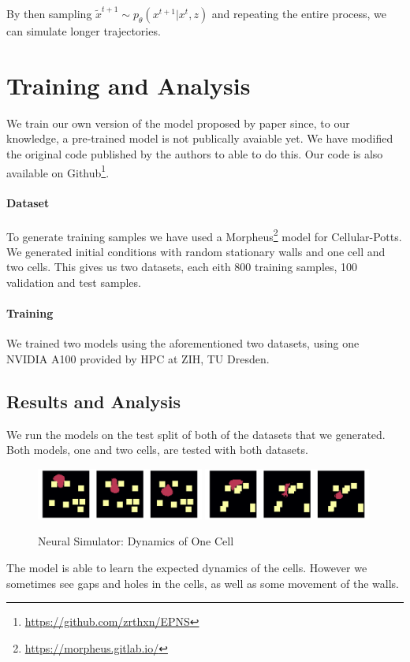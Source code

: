 \documentclass[a4paper,10pt,twocolumn]{article}
\begin{document}
            By then sampling $\tilde{x}^{t+1} \sim p_\theta(x^{t+1}|x^t, z)$ and
            repeating the entire process, we can simulate longer trajectories.


    \section{Training and Analysis}
        We train our own version of the model proposed by paper since, to our knowledge, 
        a pre-trained model is not publically avaiable yet. We have modified the original
        code published by the authors to able to do this. 
        Our code is also available on Github\footnote{\url{https://github.com/zrthxn/EPNS}}.

        \paragraph{Dataset}
        To generate training samples we have used a Morpheus\footnote{\url{https://morpheus.gitlab.io/}}\cite{morpheus} 
        model for Cellular-Potts.
        We generated initial conditions with random stationary walls and one cell and two cells. 
        This gives us two datasets, each eith 800 training samples, 100 validation and test samples.
        
        \paragraph{Training}
        We trained two models using the aforementioned two datasets, using one NVIDIA A100 
        provided by HPC at ZIH, TU Dresden.

        \subsection{Results and Analysis}
            We run the models on the test split of both of the datasets that we generated.
            Both models, one and two cells, are tested with both datasets.

            \begin{figure}[H]\centering
                \includegraphics[width=0.49\textwidth]{../images/run_40.png}
                \includegraphics[width=0.49\textwidth]{../images/run_32.png}
                \caption{Neural Simulator: Dynamics of One Cell}
            \end{figure}
            The model is able to learn the expected dynamics of the cells.
            However we sometimes see gaps and holes
            in the cells, as well as some movement of the walls.
\end{document}
